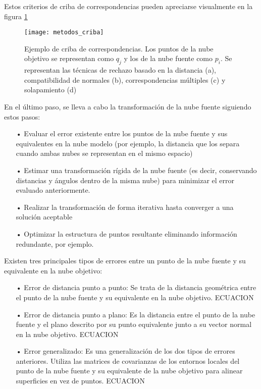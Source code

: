 Estos criterios de criba de correspondencias pueden apreciarse visualmente en la figura \ref{fig:metodos_criba}

\begin{figure}
\centering
\texttt{[image: metodos\_criba]}
\caption{Ejemplo de criba de correspondencias. Los puntos de la nube objetivo se representan como $q_j$ y los de la nube fuente como $p_i$. Se representan las técnicas de rechazo basado en la distancia (a), compatibilidad de normales (b), correspondencias múltiples (c) y solapamiento (d)}\label{fig:metodos_criba}
\end{figure}

En el último paso, se lleva a cabo la transformación de la nube fuente siguiendo estos pasos:

\begin{itemize}
\item[•]Evaluar el error existente entre los puntos de la nube fuente y sus equivalentes en la nube modelo (por ejemplo, la distancia que los separa cuando ambas nubes se representan en el mismo espacio)
\item[•]Estimar una transformación rígida de la nube fuente (es decir, conservando distancias y ángulos dentro de la misma nube) para minimizar el error evaluado anteriormente.
\item[•]Realizar la transformación de forma iterativa hasta converger a una solución aceptable
\item[•]Optimizar la estructura de puntos resultante eliminando información redundante, por ejemplo.
\end{itemize}

Existen tres principales tipos de errores entre un punto de la nube fuente y su equivalente en la nube objetivo:

\begin{itemize}
\item[•]Error de distancia punto a punto:
Se trata de la distancia geométrica entre el punto de la nube fuente y su equivalente en la nube objetivo.
ECUACION
\item[•]Error de distancia punto a plano:
Es la distancia entre el punto de la nube fuente y el plano descrito por su punto equivalente junto a su vector normal en la nube objetivo.
ECUACION
\item[•]Error generalizado:
Es una generalización de los dos tipos de errores anteriores. Utiliza las matrices de covarianzas de los entornos locales del punto de la nube fuente y su equivalente de la nube objetivo para alinear superficies en vez de puntos.
ECUACION
\end{itemize}

